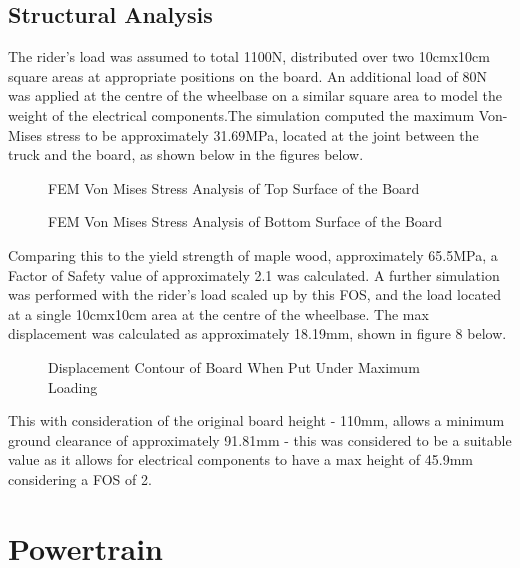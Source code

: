 \documentclass[journal,10pt]{IEEEtran}
\begin{document}
    \subsection{Structural Analysis}
        The rider's load was assumed to total 1100N, distributed over two 10cmx10cm square areas at appropriate positions on the board. An additional load of 80N was applied at the centre of the wheelbase on a similar square area to model the weight of the electrical components.The simulation computed the maximum Von-Mises stress to be approximately 31.69MPa, located at the joint between the truck and the board, as shown below in the figures below.
        \begin{figure}[H]
            \centering
            \caption{FEM Von Mises Stress Analysis of Top Surface of the Board
            }
            \label{fig:stressTop}
        \end{figure}
        \begin{figure}[H]
            \centering
            \caption{FEM Von Mises Stress Analysis of Bottom Surface of the Board
            }
            \label{fig:stressBottom}
        \end{figure}
        Comparing this to the yield strength of maple wood, approximately 65.5MPa, a Factor of Safety value of approximately 2.1 was calculated. A further simulation was performed with the rider's load scaled up by this FOS, and the load located at a single 10cmx10cm area at the centre of the wheelbase. The max displacement was calculated as approximately 18.19mm, shown in figure 8 below. 
        \begin{figure}[H]
                \centering
                \caption{Displacement Contour of Board When Put Under Maximum Loading
                }
                \label{fig:Displacement}
            \end{figure}
        This with consideration of the original board height - 110mm, allows a minimum ground clearance of approximately 91.81mm - this was considered to be a suitable value as it allows for electrical components to have a max height of 45.9mm considering a FOS of 2.
    
\section{Powertrain}
\end{document}

